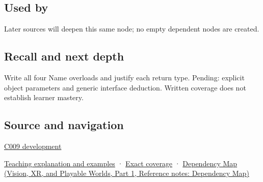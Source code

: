 \subsection{Used by}\label{appendix-d42039b1d6f7-used-by}

\hypertarget{appendix-d42039b1d6f7-used-by}{}

Later sources will deepen this same node; no empty dependent nodes are created.

\subsection{Recall and next depth}\label{appendix-d42039b1d6f7-recall-and-next-depth}

\hypertarget{appendix-d42039b1d6f7-recall-and-next-depth}{}

Write all four Name overloads and justify each return type. Pending: explicit object parameters and generic interface deduction. Written coverage does not establish learner mastery.

\subsection{Source and navigation}\label{appendix-d42039b1d6f7-source-and-navigation}

\hypertarget{appendix-d42039b1d6f7-source-and-navigation}{}

\hyperref[appendix-fd090d982a15-m009---parts-127-147]{C009 development}

\hyperref[01-foundations-i-ch003-an-accessor-must-respect-the-callers-lifetime]{Teaching explanation and examples} · \hyperref[appendix-fd090d982a15-m008---parts-113-126]{Exact coverage} · \href{../07-Vision-XR-and-Playable-Worlds-P01/main.pdf\#appendix-4ad47bdd269a}{Dependency Map (Vision, XR, and Playable Worlds, Part 1, Reference notes: Dependency Map)}

